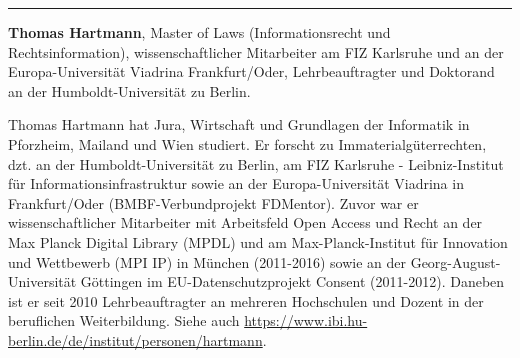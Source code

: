 \documentclass[a4paper,
fontsize=11pt,
oneside,
numbers=noperiodatend,
parskip=half-,
bibliography=totoc,
final
]{scrartcl}
\begin{document}
\begin{center}\rule{0.5\linewidth}{\linethickness}\end{center}

\textbf{Thomas Hartmann}, Master of Laws (Informationsrecht und
Rechtsinformation), wissenschaftlicher Mitarbeiter am FIZ Karlsruhe und
an der Europa-Universität Viadrina Frankfurt/Oder, Lehrbeauftragter und
Doktorand an der Humboldt-Universität zu Berlin.

Thomas Hartmann hat Jura, Wirtschaft und Grundlagen der Informatik in
Pforzheim, Mailand und Wien studiert. Er forscht zu
Immaterialgüterrechten, dzt. an der Humboldt-Universität zu Berlin, am
FIZ Karlsruhe - Leibniz-Institut für Informationsinfrastruktur sowie an
der Europa-Universität Viadrina in Frankfurt/Oder (BMBF-Verbundprojekt
FDMentor). Zuvor war er wissenschaftlicher Mitarbeiter mit Arbeitsfeld
Open Access und Recht an der Max Planck Digital Library (MPDL) und am
Max-Planck-Institut für Innovation und Wettbewerb (MPI IP) in München
(2011-2016) sowie an der Georg-August-Universität Göttingen im
EU-Datenschutzprojekt Consent (2011-2012). Daneben ist er seit 2010
Lehrbeauftragter an mehreren Hochschulen und Dozent in der beruflichen
Weiterbildung. Siehe auch
\url{https://www.ibi.hu-berlin.de/de/institut/personen/hartmann}.
\end{document}
